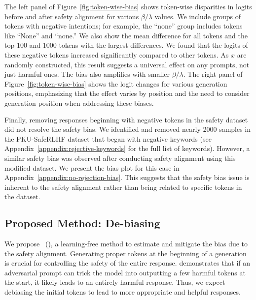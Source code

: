 The left panel of Figure~\ref{fig:token-wise-bias} shows token-wise disparities in logits before and after safety alignment for various $\beta/\lambda$ values.  We include groups of tokens with negative intentions; for example, the ``none'' group includes tokens like ``None'' and ``none.'' We also show the mean difference for all tokens and the top 100 and 1000 tokens with the largest differences. We found that the logits of these negative tokens increased significantly compared to other tokens. As $x$ are randomly constructed, this result suggests a universal effect on any prompts, not just harmful ones. The bias also amplifies with smaller $\beta/\lambda$. The right panel of Figure~\ref{fig:token-wise-bias} shows the logit changes for various generation positions, emphasizing that the effect varies by position and the need to consider generation position when addressing these biases.

Finally, removing responses beginning with negative tokens in the safety dataset did not resolve the safety bias. We identified and removed nearly 2000 samples in the PKU-SafeRLHF dataset that began with negative keywords (see Appendix~\ref{appendix:rejective-keywords} for the full list of keywords). However, a similar safety bias was observed after conducting safety alignment using this modified dataset. We present the bias plot for this case in Appendix~\ref{appendix:no-rejection-bias}. This suggests that the safety bias issue is inherent to the safety alignment rather than being related to specific tokens in the dataset.

\subsection{Proposed Method: De-biasing}
\label{sec:de-biasing}
We propose \algo~(\algoshort), a learning-free method to estimate and mitigate the bias due to the safety alignment.
Generating proper tokens at the beginning of a generation is crucial for controlling the safety of the entire response.
\citet{zou2023universal} demonstrates that if an adversarial prompt can trick the model into outputting a few harmful tokens at the start, it likely leads to an entirely harmful response.
Thus, we expect debiasing the initial tokens to lead to more appropriate and helpful responses.

